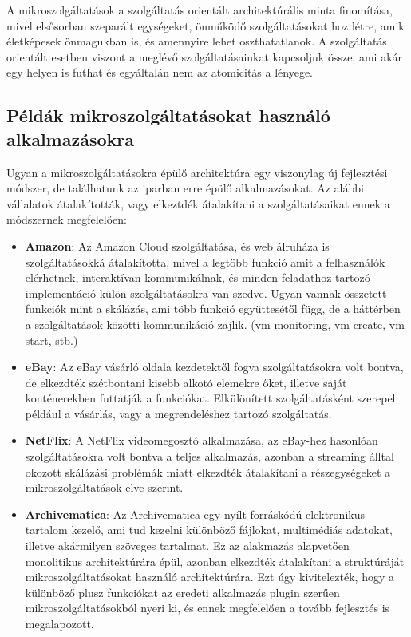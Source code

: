 \documentclass[11pt,magyar,a4paper,twoside,]{report}
\begin{document}
A mikroszolgáltatások a szolgáltatás orientált architektúrális minta
finomítása, mivel elsősorban szeparált egységeket, önműködő
szolgáltatásokat hoz létre, amik életképesek önmagukban is, és amennyire
lehet oszthatatlanok. A szolgáltatás orientált esetben viszont a meglévő
szolgáltatásainkat kapcsoljuk össze, ami akár egy helyen is futhat és
egyáltalán nem az atomicitás a lényege.

\subsection{Példák mikroszolgáltatásokat használó
alkalmazásokra}\label{puxe9lduxe1k-mikroszolguxe1ltatuxe1sokat-hasznuxe1luxf3-alkalmazuxe1sokra}

Ugyan a mikroszolgáltatásokra épülő architektúra egy viszonylag új
fejlesztési módszer, de találhatunk az iparban erre épülő
alkalmazásokat. Az alábbi vállalatok átalakították, vagy elkeztdék
átalakítani a szolgáltatásaikat ennek a módszernek megfelelően:

\begin{itemize}
\item
  \textbf{Amazon}: Az Amazon Cloud szolgáltatása, és web álruháza is
  szolgáltatásokká átalakította, mivel a legtöbb funkció amit a
  felhasználók elérhetnek, interaktívan kommunikálnak, és minden
  feladathoz tartozó implementáció külön szolgáltatásokra van szedve.
  Ugyan vannak összetett funkciók mint a skálázás, ami több funkció
  együttesétől függ, de a háttérben a szolgáltatások közötti
  kommunikáció zajlik. (vm monitoring, vm create, vm start, stb.)
\item
  \textbf{eBay}: Az eBay vásárló oldala kezdetektől fogva
  szolgáltatásokra volt bontva, de elkezdték szétbontani kisebb alkotó
  elemekre őket, illetve saját konténerekben futtatják a funkciókat.
  Elkülönített szolgáltatásként szerepel például a vásárlás, vagy a
  megrendeléshez tartozó szolgáltatás.
\item
  \textbf{NetFlix}: A NetFlix videomegosztó alkalmazása, az eBay-hez
  hasonlóan szolgáltatásokra volt bontva a teljes alkalmazás, azonban a
  streaming álltal okozott skálázási problémák miatt elkezdték
  átalakítani a részegységeket a mikroszolgáltatások elve szerint.
\item
  \textbf{Archivematica}: Az Archivematica\citep{archivematica} egy
  nyílt forráskódú elektronikus tartalom kezelő, ami tud kezelni
  különböző fájlokat, multimédiás adatokat, illetve akármilyen szöveges
  tartalmat. Ez az alakmazás alapvetően monolitikus architektúrára épül,
  azonban elkezdték átalakítani a struktúráját mikroszolgáltatásokat
  használó architektúrára. Ezt úgy kivitelezték, hogy a különböző plusz
  funkciókat az eredeti alkalmazás plugin szerűen mikroszolgáltatásokból
  nyeri ki, és ennek megfelelően a tovább fejlesztés is
  megalapozott\citep{archivematica-wiki}.
\end{itemize}
\end{document}
